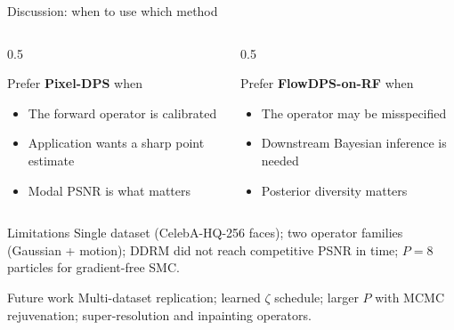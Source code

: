 \documentclass[10pt,aspectratio=169]{beamer}
\begin{document}
\begin{frame}{Discussion: when to use which method}
  \begin{columns}
    \begin{column}{0.5\linewidth}
      \begin{block}{Prefer \textbf{Pixel-DPS} when}
        \begin{itemize}
          \item The forward operator is calibrated
          \item Application wants a sharp point estimate
          \item Modal PSNR is what matters
        \end{itemize}
      \end{block}
    \end{column}
    \begin{column}{0.5\linewidth}
      \begin{block}{Prefer \textbf{FlowDPS-on-RF} when}
        \begin{itemize}
          \item The operator may be misspecified
          \item Downstream Bayesian inference is needed
          \item Posterior diversity matters
        \end{itemize}
      \end{block}
    \end{column}
  \end{columns}

  \vspace{0.3em}
  \begin{block}{Limitations}
    Single dataset (CelebA-HQ-256 faces); two operator families (Gaussian
    + motion); DDRM did not reach competitive PSNR in time;
    $P{=}8$ particles for gradient-free SMC.
  \end{block}

  \begin{block}{Future work}
    Multi-dataset replication; learned $\zeta$ schedule; larger $P$ with
    MCMC rejuvenation; super-resolution and inpainting operators.
  \end{block}
\end{frame}
\end{document}
